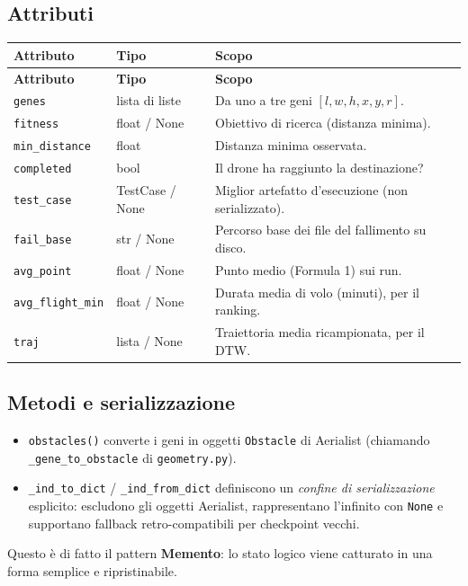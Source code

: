 \documentclass[11pt,a4paper]{report}
\newcommand{\code}[1]{\texttt{#1}}
\begin{document}
\subsection{Attributi}
\begin{longtable}{L{3.4cm} L{3cm} L{7.6cm}}
\toprule
\textbf{Attributo} & \textbf{Tipo} & \textbf{Scopo}\\
\midrule
\endfirsthead
\toprule
\textbf{Attributo} & \textbf{Tipo} & \textbf{Scopo}\\
\midrule
\endhead
\code{genes} & lista di liste & Da uno a tre geni $[l,w,h,x,y,r]$.\\
\code{fitness} & float / None & Obiettivo di ricerca (distanza minima).\\
\code{min\_distance} & float & Distanza minima osservata.\\
\code{completed} & bool & Il drone ha raggiunto la destinazione?\\
\code{test\_case} & TestCase / None & Miglior artefatto d'esecuzione (non serializzato).\\
\code{fail\_base} & str / None & Percorso base dei file del fallimento su disco.\\
\code{avg\_point} & float / None & Punto medio (Formula 1) sui run.\\
\code{avg\_flight\_min} & float / None & Durata media di volo (minuti), per il ranking.\\
\code{traj} & lista / None & Traiettoria media ricampionata, per il DTW.\\
\bottomrule
\end{longtable}

\subsection{Metodi e serializzazione}
\begin{itemize}
  \item \code{obstacles()} converte i geni in oggetti \code{Obstacle} di
        Aerialist (chiamando \code{\_gene\_to\_obstacle} di
        \code{geometry.py}).
  \item \code{\_ind\_to\_dict} / \code{\_ind\_from\_dict} definiscono un
        \emph{confine di serializzazione} esplicito: escludono gli
        oggetti Aerialist, rappresentano l'infinito con \code{None} e
        supportano fallback retro-compatibili per checkpoint vecchi.
\end{itemize}
Questo è di fatto il pattern \textbf{Memento}: lo stato logico viene
catturato in una forma semplice e ripristinabile.
\end{document}
